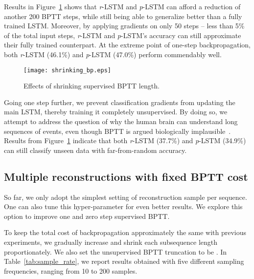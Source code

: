 \documentclass{article}
\newcommand{\rlstm}{{\it r}-LSTM}
\newcommand{\plstm}{{\it p}-LSTM}
\begin{document}
Results in Figure~\ref{fig:shrinking_bp} shows that \rlstm{} and \plstm{} can afford a reduction of another 200 BPTT steps, while still being able to generalize better than a fully trained LSTM. Moreover, by applying gradients on only 50 steps -- less than 5\% of the total input steps, \rlstm{} and \plstm{}'s accuracy can still approximate their fully trained counterpart. At the extreme point of one-step backpropagation, both \rlstm{} (46.1\%) and \plstm{} (47.0\%) perform commendably well.

\begin{figure}[htb]
\texttt{[image: shrinking\_bp.eps]}
\caption{Effects of shrinking supervised BPTT length.}
\label{fig:shrinking_bp}
\end{figure}

Going one step further, we prevent classification gradients from updating the main LSTM, thereby training it completely unsupervised. By doing so, we attempt to address the question of why the human brain can understand long sequences of events, even though BPTT is argued biologically implausible~\cite{Bengio15bioPlausibleML}. Results from Figure~\ref{fig:shrinking_bp} indicate that both \rlstm{} (37.7\%) and \plstm{} (34.9\%) can still classify unseen data with far-from-random accuracy.

\subsection{Multiple reconstructions with fixed BPTT cost} \label{sec:sample_frequency}

So far, we only adopt the simplest setting of  reconstruction sample per sequence. One can also tune this hyper-parameter for even better results. We explore this option to improve one and zero step supervised BPTT. 

To keep the total cost of backpropagation approximately the same with previous experiments, we gradually increase  and shrink each subsequence length  proportionately. We also set the unsupervised BPTT truncation to be . In Table~\ref{tab:sample_rate}, we report results obtained with five different sampling frequencies, ranging from 10 to 200 samples.
\end{document}
